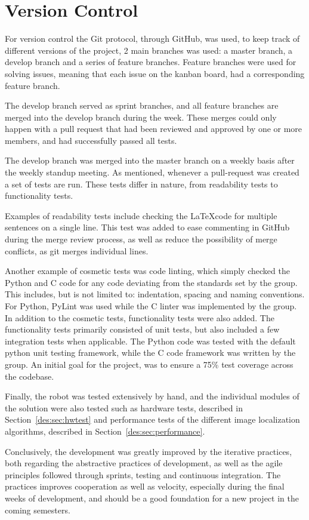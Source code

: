 \section{Version Control}
For version control the Git protocol, through GitHub, was used, to keep track of different versions of the project, 2 main branches was used: a master branch, a develop branch and a series of feature branches.
Feature branches were used for solving issues, meaning that each issue on the kanban board, had a corresponding feature branch.

The develop branch served as sprint branches, and all feature branches are merged into the develop branch during the week.
These merges could only happen with a pull request that had been reviewed and approved by one or more members, and had successfully passed all tests.

The develop branch was merged into the master branch on a weekly basis after the weekly standup meeting.
As mentioned, whenever a pull-request was created a set of tests are run. 
These tests differ in nature, from readability tests to functionality tests.

Examples of readability tests include checking the \LaTeX code for multiple sentences on a single line.
This test was added to ease commenting in GitHub during the merge review process, as well as reduce the possibility of merge conflicts, as git merges individual lines.

Another example of cosmetic tests was code linting, which simply checked the Python and C code for any code deviating from the standards set by the group.
This includes, but is not limited to: indentation, spacing and naming conventions.
For Python, PyLint was used while the C linter was implemented by the group.
In addition to the cosmetic tests, functionality tests were also added.
The functionality tests primarily consisted of unit tests, but also included a few integration tests when applicable.
The Python code was tested with the default python unit testing framework, while the C code framework was written by the group.
An initial goal for the project, was to ensure a 75\% test coverage across the codebase.

Finally, the robot was tested extensively by hand, and the individual modules of the solution were also tested such as hardware tests, described in Section~\ref{des:sec:hwtest} and performance tests of the different image localization algorithms, described in Section~\ref{des:sec:performance}.

Conclusively, the development was greatly improved by the iterative practices, both regarding the abstractive practices of development, as well as the agile principles followed through sprints, testing and continuous integration.
The practices improves cooperation as well as velocity, especially during the final weeks of development, and should be a good foundation for a new project in the coming semesters.
